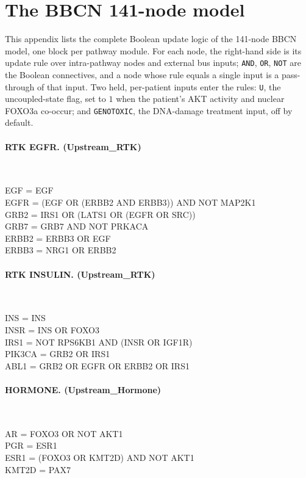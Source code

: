 \section{The BBCN 141-node model}
\label{app:rules}
This appendix lists the complete Boolean update logic of the 141-node BBCN model, one block per pathway module. For each node, the right-hand side is its update rule over intra-pathway nodes and external bus inputs; \texttt{AND}, \texttt{OR}, \texttt{NOT} are the Boolean connectives, and a node whose rule equals a single input is a pass-through of that input. Two held, per-patient inputs enter the rules: \texttt{U}, the uncoupled-state flag, set to $1$ when the patient's AKT activity and nuclear FOXO3a co-occur; and \texttt{GENOTOXIC}, the DNA-damage treatment input, off by default.

\paragraph{RTK EGFR. (Upstream\_RTK)}\mbox{}\\
\begin{flushleft}\ttfamily\small
EGF = EGF\\
EGFR = (EGF OR (ERBB2 AND ERBB3)) AND NOT MAP2K1\\
GRB2 = IRS1 OR (LATS1 OR (EGFR OR SRC))\\
GRB7 = GRB7 AND NOT PRKACA\\
ERBB2 = ERBB3 OR EGF\\
ERBB3 = NRG1 OR ERBB2\\
\end{flushleft}

\paragraph{RTK INSULIN. (Upstream\_RTK)}\mbox{}\\
\begin{flushleft}\ttfamily\small
INS = INS\\
INSR = INS OR FOXO3\\
IRS1 = NOT RPS6KB1 AND (INSR OR IGF1R)\\
PIK3CA = GRB2 OR IRS1\\
ABL1 = GRB2 OR EGFR OR ERBB2 OR IRS1\\
\end{flushleft}

\paragraph{HORMONE. (Upstream\_Hormone)}\mbox{}\\
\begin{flushleft}\ttfamily\small
AR = FOXO3 OR NOT AKT1\\
PGR = ESR1\\
ESR1 = (FOXO3 OR KMT2D) AND NOT AKT1\\
KMT2D = PAX7\\
\end{flushleft}

